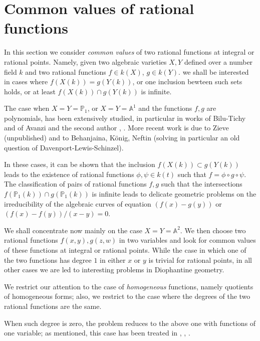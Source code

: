 \documentclass[leqno,12pt]{article} %
\def\A{{{\mathbb A}}}
\def\P{{{\mathbb P}}}
\theoremstyle{plain} %
\theoremstyle{definition} %
\begin{document}
\section{Common values of rational functions} 
In this section we consider {\it common values} of two rational functions at integral or rational points. Namely, given two algebraic varieties $X,Y$ defined over a number field $k$ and two rational functions $f\in k(X)$, $g\in k(Y)$. we shall be interested in cases where $f(X(k))=g(Y(k))$, or one inclusion bewteen such sets holds, or at least $f(X(k))\cap g(Y(k))$ is infinite.

\smallskip

The case when $X=Y=\P_1$, or $X=Y=\A^1$ and the functions $f,g$ are polynomials, has been extensively studied, in particular in works of {\sc Bilu-Tichy} \cite{BT} and of {\sc Avanzi } and the second author \cite{AZ1}, \cite{AZ2}. More recent work is due to {\sc Zieve} (unpublished) and to {\sc Behanjaina, K\"onig, Neftin} \cite{BKN} (solving in particular an old question of {\sc Davenport-Lewis-Schinzel}).

 In these cases, it can be shown  that the inclusion $f(X(k))\subset g(Y(k))$ leads to the existence of  rational functions $\phi,\psi \in k(t)$ such that $f=\phi\circ g\circ \psi$. 
The classification of pairs of rational functions $f,g$ such that the intersections $f(\P_1(k))\cap g(\P_1(k))$ is infinite leads to delicate geometric problems on the irreducibility of the algebraic curves of equation $(f(x)-g(y))$ or $(f(x)-f(y))/(x-y)=0$. 
 
\smallskip

We shall concentrate now mainly on the case $X=Y=\A^2$.  We then choose two rational functions $f(x,y), g(z,w)$ in two variables and look for common values of these functions at integral or rational points. 
While the case in which one of the two functions has degree $1$ in either $x$ or $y$ is trivial for rational points, in all other cases we are led to  interesting problems in Diophantine geometry. 

\medskip

We restrict our attention to the case of {\it homogeneous} functions, namely quotients of homogeneous forms; also, we restrict to the case where the degrees of the two rational functions are the same. 

When such  degree is zero, the   problem reduces to the above one with functions of one variable; as mentioned, this case has been treated in \cite{BT}, \cite{AZ1}, \cite{AZ2}.
\end{document}
